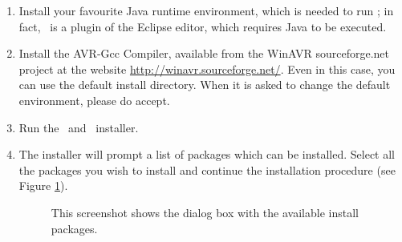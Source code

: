 \begin{enumerate}

\item Install your favourite Java runtime environment, which is needed
  to run \rtd; in fact, \rtd\ is a plugin of the Eclipse editor, which
  requires Java to be executed.

\item Install the AVR-Gcc Compiler, available from the WinAVR sourceforge.net 
  project at the website \url{http://winavr.sourceforge.net/}.  
  Even in this case, you can use the default install directory. 
  When it is asked to change the default environment, please do accept.

\item Run the \ee\ and \rtd\ installer.

\item The installer will prompt a list of packages which can be
  installed. Select all the packages you wish to install and
  continue the installation procedure (see Figure \ref{fig:installer-options}).
%
\begin{figure}[htb]
\caption{This screenshot shows the dialog box with the available install packages.}
\label{fig:installer-options}
\end{figure}


\end{enumerate}
